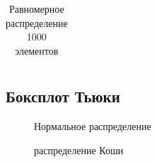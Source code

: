\documentclass[a4paper]{article}
\begin{document}
        \begin{table}[H]
            \centering
            \begin{tabular}{|c|c|c|c|c|c|}
                \hline
                
            \end{tabular}
            \caption{Равномерное распределение 1000 элементов}
            \label{tab:uniform_1000}
        \end{table}

    \subsection{Боксплот Тьюки}
\begin{figure}[H]
\label{fig:normal}
\caption{Нормальное распределение}
\end{figure}

\begin{figure}[H]
\label{fig:cauchy}
\caption{распределение Коши}
\end{figure}
\end{document}

